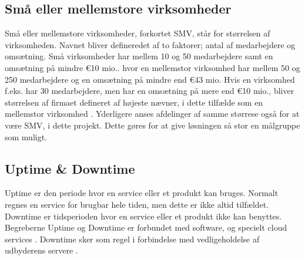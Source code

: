 \subsection{Små eller mellemstore virksomheder}
Små eller mellemstore virksomheder, forkortet SMV, står for størrelsen af virksomheden. Navnet bliver defineredet af to faktorer; antal af medarbejdere og omsætning. Små virksomheder har mellem 10 og 50 medarbejdere samt en omsætning på mindre \euro 10 mio.. hvor en mellemstor virksomhed har mellem 50 og 250 medarbejdere og en omsætning på mindre end \euro 43 mio. Hvis en virksomhed f.eks. har 30 medarbejdere, men har en omsætning på mere end \euro 10 mio., bliver størrelsen af firmaet defineret af højeste nævner, i dette tilfælde som en mellemstor virksomhed \citep{SMV}. Yderligere anses afdelinger af samme størrese også for at være SMV, i dette projekt. Dette gøres for at give løsningen så stor en målgruppe som muligt.

\subsection{Uptime \& Downtime}
Uptime er den periode hvor en service eller et produkt kan bruges. Normalt regnes en service for brugbar hele tiden, men dette er ikke altid tilfældet. Downtime er tidsperioden hvor en service eller et produkt ikke kan benyttes. Begreberne Uptime og Downtime er forbundet med software, og specielt cloud services \citep{drpbx_downtime, UpDown}. Downtime sker som regel i forbindelse med vedligeholdelse af udbyderens servere \citep{drpbx_downtime}.